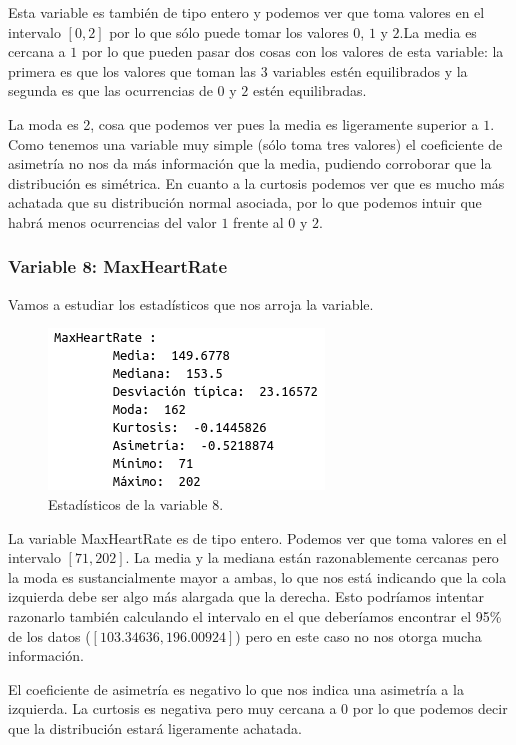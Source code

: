 \documentclass[12pt,a4paper]{article}
\begin{document}
Esta variable es también de tipo entero y podemos ver que toma valores en el intervalo $[0,2]$ por lo que sólo puede tomar los valores $0$, $1$ y $2$.La media es cercana a $1$ por lo que pueden pasar dos cosas con los valores de esta variable: la primera es que los valores que toman las 3 variables estén equilibrados y la segunda es que las ocurrencias de $0$ y $2$ estén equilibradas.

La moda es 2, cosa que podemos ver pues la media es ligeramente superior a $1$. Como tenemos una variable muy simple (sólo toma tres valores) el coeficiente de asimetría no nos da más información que la media, pudiendo corroborar que la distribución es simétrica. En cuanto a la curtosis podemos  ver que es mucho más achatada que su distribución normal asociada, por lo que podemos intuir que habrá menos ocurrencias del valor $1$ frente al $0$ y $2$.

\subsubsection*{Variable 8: MaxHeartRate}

Vamos a estudiar los estadísticos que nos arroja la variable.

\begin{figure}[H]
	\centering
	\includegraphics[scale=0.7]{./Imagenes/EDA/Clasificacion/estadisticos_variable8.png}
	\caption{Estadísticos de la variable 8.}
\end{figure}

La variable MaxHeartRate es de tipo entero. Podemos ver que toma valores en el intervalo $[71,202]$. La media y la mediana están razonablemente cercanas pero la moda es sustancialmente mayor a ambas, lo que nos está indicando que la cola izquierda debe ser algo más alargada que la derecha. Esto podríamos intentar razonarlo también calculando el intervalo en el que deberíamos encontrar el 95\% de los datos ($[103.34636,196.00924]$) pero en este caso no nos otorga mucha información.

El coeficiente de asimetría es negativo lo que nos indica una asimetría a la izquierda. La curtosis es negativa pero muy cercana a $0$ por lo que podemos decir que la distribución estará ligeramente achatada.
\end{document}

